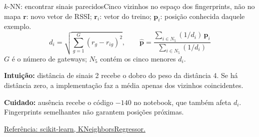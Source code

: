\begin{frame}{$k$-NN: encontrar sinais parecidos}{Cinco vizinhos no espaço dos fingerprints, não no mapa}
\small
\setlength{\abovedisplayskip}{4pt}\setlength{\belowdisplayskip}{4pt}
$\mathbf r$: novo vetor de RSSI; $\mathbf r_i$: vetor do treino;
$\mathbf p_i$: posição conhecida daquele exemplo.
\[
d_i=\sqrt{\sum_{g=1}^{G}(r_g-r_{ig})^2},
\qquad
\widehat{\mathbf p}=
\frac{\sum_{i\in N_5}(1/d_i)\,\mathbf p_i}{\sum_{i\in N_5}(1/d_i)}
\]
$G$ é o número de gateways; $N_5$ contém os cinco menores $d_i$.
\par\vspace{3mm}
\centering
{}
\par\vspace{1mm}\raggedright
\textbf{Intuição:} distância de sinais 2 recebe o dobro do peso da distância 4.
Se há distância zero, a implementação faz a média apenas dos vizinhos coincidentes.
\par\vspace{2mm}
\textbf{Cuidado:} ausência recebe o código $-140$ no notebook, que também afeta $d_i$.
Fingerprints semelhantes não garantem posições próximas.
\par\scriptsize \href{https://scikit-learn.org/stable/modules/generated/sklearn.neighbors.KNeighborsRegressor.html}{Referência: scikit-learn, KNeighborsRegressor.}
\end{frame}

